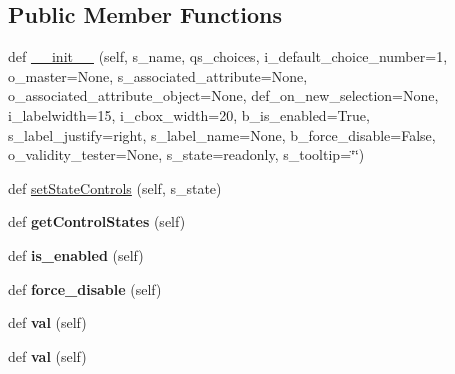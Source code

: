 \subsection*{Public Member Functions}
\begin{DoxyCompactItemize}
\item 
def \hyperlink{classnegui_1_1pgkeylistcomboframe_1_1KeyListComboFrame_a5e92a43eef9e5a38c4337d185db637bd}{\+\_\+\+\_\+init\+\_\+\+\_\+} (self, s\+\_\+name, qs\+\_\+choices, i\+\_\+default\+\_\+choice\+\_\+number=1, o\+\_\+master=None, s\+\_\+associated\+\_\+attribute=None, o\+\_\+associated\+\_\+attribute\+\_\+object=None, def\+\_\+on\+\_\+new\+\_\+selection=None, i\+\_\+labelwidth=15, i\+\_\+cbox\+\_\+width=20, b\+\_\+is\+\_\+enabled=True, s\+\_\+label\+\_\+justify=\textquotesingle{}right\textquotesingle{}, s\+\_\+label\+\_\+name=None, b\+\_\+force\+\_\+disable=False, o\+\_\+validity\+\_\+tester=None, s\+\_\+state=\textquotesingle{}readonly\textquotesingle{}, s\+\_\+tooltip=\char`\"{}\char`\"{})
\item 
def \hyperlink{classnegui_1_1pgkeylistcomboframe_1_1KeyListComboFrame_a2b670cd4d4a38d03ae90df2786f076cb}{set\+State\+Controls} (self, s\+\_\+state)
\item 
def {\bfseries get\+Control\+States} (self)\hypertarget{classnegui_1_1pgkeylistcomboframe_1_1KeyListComboFrame_a2844d874ea9aac4c1ec0f8906099345f}{}\label{classnegui_1_1pgkeylistcomboframe_1_1KeyListComboFrame_a2844d874ea9aac4c1ec0f8906099345f}

\item 
def {\bfseries is\+\_\+enabled} (self)\hypertarget{classnegui_1_1pgkeylistcomboframe_1_1KeyListComboFrame_a796be506f3a271e058eeb375ef6c4713}{}\label{classnegui_1_1pgkeylistcomboframe_1_1KeyListComboFrame_a796be506f3a271e058eeb375ef6c4713}

\item 
def {\bfseries force\+\_\+disable} (self)\hypertarget{classnegui_1_1pgkeylistcomboframe_1_1KeyListComboFrame_af0a62d97038cca869e84b09679cca854}{}\label{classnegui_1_1pgkeylistcomboframe_1_1KeyListComboFrame_af0a62d97038cca869e84b09679cca854}

\item 
def {\bfseries val} (self)\hypertarget{classnegui_1_1pgkeylistcomboframe_1_1KeyListComboFrame_acca01b41da0563141822b38dee5e6efe}{}\label{classnegui_1_1pgkeylistcomboframe_1_1KeyListComboFrame_acca01b41da0563141822b38dee5e6efe}

\item 
def {\bfseries val} (self)\hypertarget{classnegui_1_1pgkeylistcomboframe_1_1KeyListComboFrame_acca01b41da0563141822b38dee5e6efe}{}\label{classnegui_1_1pgkeylistcomboframe_1_1KeyListComboFrame_acca01b41da0563141822b38dee5e6efe}

\end{DoxyCompactItemize}
